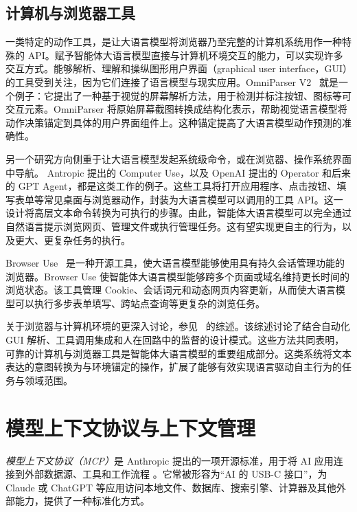 \subsection{计算机与浏览器工具}
\label{sec:computer_browser_tools}

一类特定的动作工具，是让大语言模型将浏览器乃至完整的计算机系统用作一种特殊的 API。赋予智能体大语言模型直接与计算机环境交互的能力，可以实现许多交互方式。能够解析、理解和操纵图形用户界面（graphical user interface，GUI）的工具受到关注，因为它们连接了语言模型与现实应用。OmniParser V2~\citep{lu2024omniparserpurevisionbased} 就是一个例子：它提出了一种基于视觉的屏幕解析方法，用于检测并标注按钮、图标等可交互元素。OmniParser 将原始屏幕截图转换成结构化表示，帮助视觉语言模型将动作决策锚定到具体的用户界面组件上。这种锚定提高了大语言模型动作预测的准确性。

另一个研究方向侧重于让大语言模型发起系统级命令，或在浏览器、操作系统界面中导航。
Antropic 提出的 Computer Use，以及 OpenAI 提出的 Operator 和后来的 GPT Agent，都是这类工作的例子。这些工具将打开应用程序、点击按钮、填写表单等常见桌面与浏览器动作，封装为大语言模型可以调用的工具 API。这一设计将高层文本命令转换为可执行的步骤。由此，智能体大语言模型可以完全通过自然语言提示浏览网页、管理文件或执行管理任务。这有望实现更自主的行为，以及更大、更复杂任务的执行。

Browser Use~\citep{browser_use2024} 是一种开源工具，使大语言模型能够使用具有持久会话管理功能的浏览器。Browser Use 使智能体大语言模型能够跨多个页面或域名维持更长时间的浏览状态。该工具管理 Cookie、会话词元和动态网页内容更新，从而使大语言模型可以执行多步表单填写、跨站点查询等更复杂的浏览任务。

关于浏览器与计算机环境的更深入讨论，参见~\citet{wang2025guiagentsfoundationmodels} 的综述。该综述讨论了结合自动化 GUI 解析、工具调用集成和人在回路中的监督的设计模式。这些方法共同表明，可靠的计算机与浏览器工具是智能体大语言模型的重要组成部分。这类系统将文本表达的意图转换为与环境锚定的操作，扩展了能够有效实现语言驱动自主行为的任务与领域范围。



\section{模型上下文协议与上下文管理}\label{sec:mcp}

\textit{模型上下文协议（MCP）}是 Anthropic 提出的一项开源标准，用于将 AI 应用连接到外部数据源、工具和工作流程 \citep{xinyi2026mcp}。它常被形容为“AI 的 USB-C 接口”，为 Claude 或 ChatGPT 等应用访问本地文件、数据库、搜索引擎、计算器及其他外部能力，提供了一种标准化方式。

